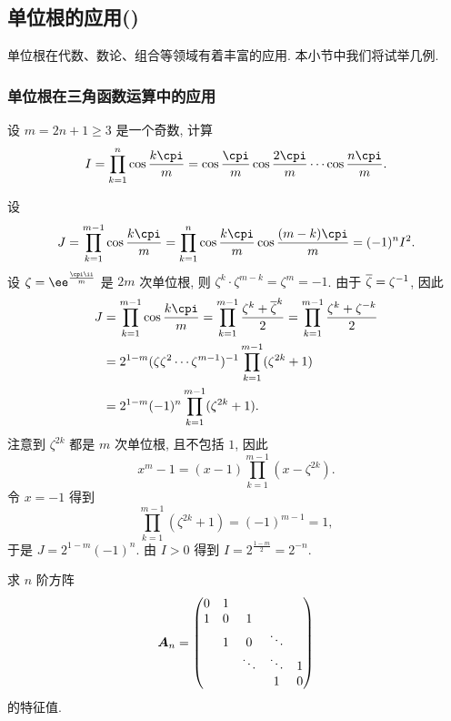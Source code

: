 \subsection{单位根的应用(\optional)}

单位根在代数、数论、组合等领域有着丰富的应用.
本小节中我们将试举几例.


\subsubsection{单位根在三角函数运算中的应用}

\begin{example}
  设 $m=2n+1\ge 3$ 是一个奇数, 计算
  \[
    I=\prod_{k=1}^n\cos\frac{k\cpi}m
    =\cos\frac{\cpi}m \cos\frac{2\cpi}m \cdots \cos\frac{n\cpi}m.
  \]
\end{example}

\begin{solution}
  设
  \[
     J
    =\prod_{k=1}^{m-1}\cos\frac{k\cpi}m
    =\prod_{k=1}^n\cos\frac{k\cpi}m\cos\frac{(m-k)\cpi}m
    =(-1)^n I^2.
  \]
  设 $\zeta=\ee^{\frac{\cpi\ii}m}$ 是 $2m$ 次单位根, 则 $\zeta^k\cdot\zeta^{m-k}=\zeta^m=-1$.
  由于 $\overline\zeta=\zeta^{-1}$, 因此
  \begin{align*}
     J&
    =\prod_{k=1}^{m-1}\cos\frac{k\cpi}m
    =\prod_{k=1}^{m-1}\frac{\zeta^k+{\ov\zeta}^k}2
    =\prod_{k=1}^{m-1}\frac{\zeta^k+\zeta^{-k}}2\\&
    =2^{1-m}(\zeta\zeta^2\cdots\zeta^{m-1})^{-1}
      \prod_{k=1}^{m-1}(\zeta^{2k}+1)\\&
    =2^{1-m}(-1)^n
      \prod_{k=1}^{m-1}(\zeta^{2k}+1).
  \end{align*}
  注意到 $\zeta^{2k}$ 都是 $m$ 次单位根, 且不包括 $1$, 因此
  \[
    x^m-1=(x-1)\prod_{k=1}^{m-1}(x-\zeta^{2k}).
  \]
  令 $x=-1$ 得到
  \[
    \prod_{k=1}^{m-1}(\zeta^{2k}+1)=(-1)^{m-1}=1,
  \]
  于是 $J=2^{1-m}(-1)^n$.
  由 $I>0$ 得到 $I=2^{\frac{1-m}2}=2^{-n}$.
\end{solution}

\begin{example}
  求 $n$ 阶方阵
  \[
    {\boldsymbol{A}}_n=\begin{pmatrix}
      0&1&&&\\
      1&0&1&&\\
      &1&0&\ddots&\\
      &&\ddots&\ddots &1\\
      &&&1&0
    \end{pmatrix}
  \]
  的特征值.
\end{example}

